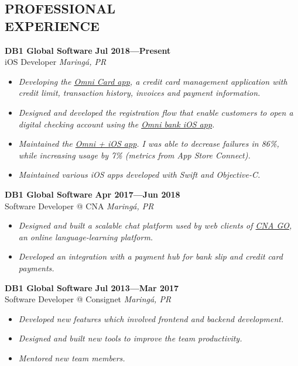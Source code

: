 \documentclass[line,margin]{res}
\begin{document}


\address{\sl \href{https://marcosatanaka.com}{marcosatanaka.com} --- \href{mailto:marcosatanaka@gmail.com}{marcosatanaka@gmail.com}}


\begin{resume}


\section{PROFESSIONAL \\ EXPERIENCE}
  {\bf DB1 Global Software} \hfill {\bf Jul 2018---Present} \\
  iOS Developer \hfill {\sl Maring\'a, PR}\\[-6pt]
  \begin{itemize}
    \item {\sl Developing the \href{https://apps.apple.com/us/app/id1490242421}{Omni Card app}, a credit card management application with credit limit, transaction history, invoices and payment information.}
    \item {\sl Designed and developed the registration flow that enable customers to open a digital checking account using the \href{https://apps.apple.com/br/app/omni-banco/id1369601365}{Omni bank iOS app}.}
    \item {\sl Maintained the \href{https://apps.apple.com/br/app/omni/id1276332750}{Omni + iOS app}. I was able to decrease failures in 86\%, while increasing usage by 7\% (metrics from App Store Connect).}
    \item {\sl Maintained various iOS apps developed with Swift and Objective-C.}
  \end{itemize}

  {\bf DB1 Global Software} \hfill {\bf Apr 2017---Jun 2018} \\
  Software Developer @ CNA \hfill {\sl Maring\'a, PR}\\[-6pt]
  \begin{itemize}
    \item {\sl Designed and built a scalable chat platform used by web clients of \href{https://www.cnago.com.br}{CNA GO}, an online language-learning platform.}
    \item {\sl Developed an integration with a payment hub for
               bank slip and credit card payments.}
  \end{itemize}

  {\bf DB1 Global Software} \hfill {\bf Jul 2013---Mar 2017} \\
  Software Developer @ Consignet \hfill {\sl Maring\'a, PR}\\[-6pt]
  \begin{itemize}
    \item {\sl Developed new features which involved
               frontend and backend development.}
    \item {\sl Designed and built new tools to improve the team productivity.}
    \item {\sl Mentored new team members.}
  \end{itemize}


\end{resume}
\end{document}
